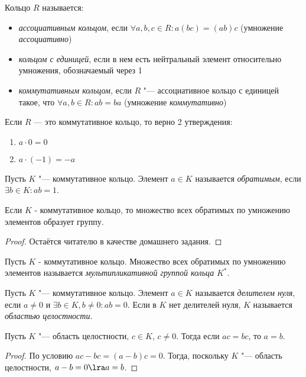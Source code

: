 \begin{definition}
	Кольцо $R$ называется:
	\begin{itemize}
		\item \textit{ассоциативным кольцом}, если $\forall a, b, c \in R: a(bc) = (ab)c$ (умножение \textit{ассоциативно})
		\item \textit{кольцом с единицей}, если в нем есть нейтральный элемент относительно умножения, обозначаемый через 1
		\item \textit{коммутативным кольцом}, если $R$ "--- ассоциативное кольцо с единицей такое, что $\forall a, b \in R: ab = ba$ (умножение \textit{коммутативно})
	\end{itemize}
\end{definition}

\begin{exercise}
	Если $R$ --- это коммутативное кольцо, то верно 2 утверждения:
	\begin{enumerate}
		\item $a \cdot 0 = 0$
		
		\item $a \cdot (-1) = -a$
	\end{enumerate}
\end{exercise}

\begin{definition}
	Пусть $K$ "--- коммутативное кольцо. Элемент $a \in K$ называется \textit{обратимым}, если $\exists b \in K: ab = 1$.
\end{definition}

\begin{proposition}
	Если $K$ - коммутативное кольцо, то множество всех обратимых по умножению элементов образует группу.
\end{proposition}

\begin{proof}
	Остаётся читателю в качестве домашнего задания.
\end{proof}

\begin{definition}
	Пусть $K$ - коммутативное кольцо. Множество всех обратимых по умножению элементов называется \textit{мультипликативной группой кольца} $K^*$.
\end{definition}

\begin{definition}
	Пусть $K$ "--- коммутативное кольцо. Элемент $a \in K$ называется \textit{делителем нуля}, если $a \ne 0$ и $\exists b \in K, b \ne 0: ab = 0$. Если в $K$ нет делителей нуля, $K$ называется \textit{областью целостности}.
\end{definition}

\begin{proposition}
	Пусть $K$ "--- область целостности, $c \in K$, $c \ne 0$. Тогда если $ac = bc$, то $a = b$.
\end{proposition}

\begin{proof}
	По условию $ac - bc = (a - b)c = 0$. Тогда, поскольку $K$ "--- область целостности, $a - b = 0 \lra a = b$.
\end{proof}